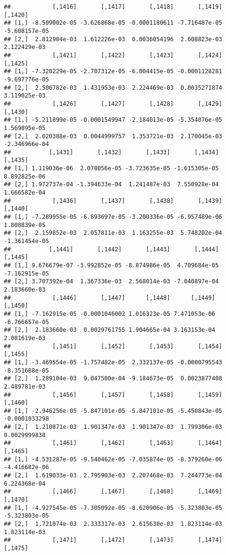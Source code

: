 \documentclass[
]{article}
\begin{document}
\begin{verbatim}
##            [,1416]       [,1417]       [,1418]       [,1419]       [,1420]
## [1,] -8.509002e-05 -3.626868e-05 -0.0001180611 -7.716487e-05 -5.608157e-05
## [2,]  2.812904e-03  1.612226e-03  0.0036054196  2.608823e-03  2.122429e-03
##            [,1421]       [,1422]       [,1423]       [,1424]       [,1425]
## [1,] -7.320229e-05 -2.707312e-05 -6.004415e-05 -0.0001128281 -9.697776e-05
## [2,]  2.506782e-03  1.431953e-03  2.224469e-03  0.0035271874  3.119025e-03
##            [,1426]       [,1427]       [,1428]       [,1429]       [,1430]
## [1,] -5.211899e-05 -0.0001549947 -2.184013e-05 -5.354076e-05  1.569895e-05
## [2,]  2.020388e-03  0.0044999757  1.353721e-03  2.170045e-03 -2.346966e-04
##           [,1431]       [,1432]       [,1433]       [,1434]      [,1435]
## [1,] 1.119036e-06  2.078056e-05 -3.723635e-05 -1.615305e-05 8.892825e-06
## [2,] 1.972737e-04 -1.394633e-04  1.241487e-03  7.550928e-04 1.666582e-04
##            [,1436]       [,1437]       [,1438]       [,1439]       [,1440]
## [1,] -7.289955e-05 -6.893697e-05 -3.200336e-05 -6.957489e-06  1.808839e-05
## [2,]  2.159852e-03  2.057811e-03  1.163255e-03  5.748202e-04 -1.361454e-05
##           [,1441]       [,1442]       [,1443]       [,1444]       [,1445]
## [1,] 9.676679e-07 -3.992852e-05 -8.874986e-05  4.709684e-05 -7.162915e-05
## [2,] 3.707392e-04  1.367336e-03  2.568014e-03 -7.040897e-04  2.183660e-03
##            [,1446]       [,1447]      [,1448]      [,1449]       [,1450]
## [1,] -7.162915e-05 -0.0001046002 1.016323e-05 7.471053e-06 -6.766657e-05
## [2,]  2.183660e-03  0.0029761755 1.904665e-04 3.163153e-04  2.081619e-03
##            [,1451]       [,1452]       [,1453]       [,1454]       [,1455]
## [1,] -3.469554e-05 -1.757482e-05  2.332137e-05 -0.0000795543 -8.351688e-05
## [2,]  1.289104e-03  9.047500e-04 -9.184673e-05  0.0023877408  2.489781e-03
##            [,1456]       [,1457]       [,1458]       [,1459]       [,1460]
## [1,] -2.946256e-05 -5.847101e-05 -5.847101e-05 -5.450843e-05 -0.0001033298
## [2,]  1.210871e-03  1.901347e-03  1.901347e-03  1.799306e-03  0.0029999838
##            [,1461]       [,1462]       [,1463]       [,1464]       [,1465]
## [1,] -4.531287e-05 -9.540462e-05 -7.035874e-05 -8.379260e-06 -4.416682e-06
## [2,]  1.619033e-03  2.795903e-03  2.207468e-03  7.244773e-04  6.224368e-04
##            [,1466]       [,1467]       [,1468]       [,1469]       [,1470]
## [1,] -4.927545e-05 -7.305092e-05 -8.620906e-05 -5.323803e-05 -5.323803e-05
## [2,]  1.721074e-03  2.333317e-03  2.615630e-03  1.823114e-03  1.823114e-03
##            [,1471]       [,1472]       [,1473]       [,1474]       [,1475]

\end{verbatim}
\end{document}
